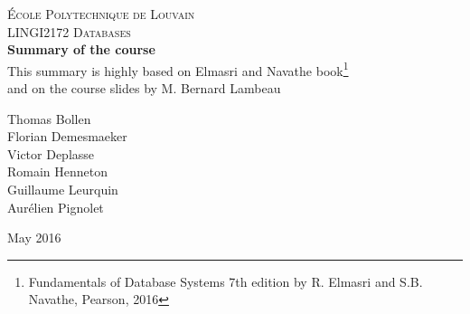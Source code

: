 \documentclass{report}
\begin{document}

\begin{titlepage}
\newcommand{\HRule}{\rule{\linewidth}{0.5mm}} %
\centering %
 
\null
\vspace{1cm}
\textsc{\large \'Ecole Polytechnique de Louvain}\\[3cm] %
\textsc{\Large LINGI2172 Databases}\\[2cm] 


{ \LARGE \bfseries Summary of the course} \\[0.4cm]
{ \normalsize This summary is highly based on Elmasri and Navathe book\footnote{Fundamentals of Database Systems 7th edition by R. Elmasri and S.B. Navathe, Pearson, 2016}\\ and on the course slides by M. Bernard Lambeau} \\[0.4cm]

\begin{figure}[h!]
\centering
\end{figure}


{\large Thomas Bollen \\ Florian Demesmaeker \\ Victor Deplasse \\ Romain Henneton \\ Guillaume Leurquin \\ Aurélien Pignolet }

\vfill


{\normalsize May 2016}%
\vspace{2cm}

\newpage

\end{titlepage}
\setcounter{page}{1}
\end{document}
